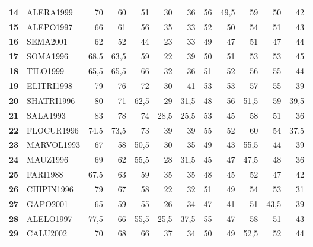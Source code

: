 \begin{landscape}
\begin{table}[p]
\begin{tabular}{>{\bfseries}cl*{10}{D{,}{,}{2.1}}}
14 & ALERA1999 & 70 & 60 & 51 & 30 & 36 & 56 & 49,5 & 59 & 50 & 42 \\
15 & ALEPO1997 & 66 & 61 & 56 & 35 & 33 & 52 & 50 & 54 & 51 & 43 \\
16 & SEMA2001 & 62 & 52 & 44 & 23 & 33 & 49 & 47 & 51 & 47 & 44 \\
17 & SOMA1996 & 68,5 & 63,5 & 59 & 22 & 39 & 50 & 51 & 53 & 53 & 45 \\
18 & TILO1999 & 65,5 & 65,5 & 66 & 32 & 36 & 51 & 52 & 56 & 55 & 44 \\
19 & ELITRI1998 & 79 & 76 & 72 & 30 & 41 & 53 & 53 & 57 & 55 & 39 \\
20 & SHATRI1996 & 80 & 71 & 62,5 & 29 & 31,5 & 48 & 56 & 51,5 & 59 & 39,5 \\
21 & SALA1993 & 83 & 78 & 74 & 28,5 & 25,5 & 53 & 45 & 58 & 51 & 36 \\
22 & FLOCUR1996 & 74,5 & 73,5 & 73 & 39 & 39 & 55 & 52 & 60 & 54 & 37,5 \\
23 & MARVOL1993 & 67 & 58 & 50,5 & 30 & 35 & 49 & 43 & 55,5 & 44 & 39 \\
24 & MAUZ1996 & 69 & 62 & 55,5 & 28 & 31,5 & 45 & 47 & 47,5 & 48 & 36 \\
25 & FARI1988 & 67,5 & 63 & 59 & 35 & 35 & 48 & 45 & 52 & 47 & 42 \\
26 & CHIPIN1996 & 79 & 67 & 58 & 22 & 32 & 51 & 49 & 54 & 53 & 31 \\
27 & GAPO2001 & 65 & 59 & 55 & 26 & 34 & 47 & 41 & 51 & 43,5 & 39 \\
28 & ALELO1997 & 77,5 & 66 & 55,5 & 25,5 & 37,5 & 55 & 47 & 58 & 51 & 43 \\
29 & CALU2002 & 70 & 68 & 66 & 37 & 34 & 50 & 49 & 52,5 & 52 & 44 \\
\bottomrule
\end{tabular}
\end{table}


\end{landscape}
